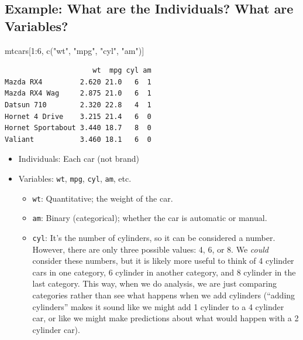 \documentclass[
  letterpaper,
  DIV=11,
  numbers=noendperiod,
  oneside]{scrreprt}
\newenvironment{Shaded}{\begin{snugshade}}{\end{snugshade}}
\newcommand{\DecValTok}[1]{\textcolor[rgb]{0.68,0.00,0.00}{#1}}
\newcommand{\FunctionTok}[1]{\textcolor[rgb]{0.28,0.35,0.67}{#1}}
\newcommand{\NormalTok}[1]{\textcolor[rgb]{0.00,0.23,0.31}{#1}}
\newcommand{\SpecialCharTok}[1]{\textcolor[rgb]{0.37,0.37,0.37}{#1}}
\newcommand{\StringTok}[1]{\textcolor[rgb]{0.13,0.47,0.30}{#1}}
\providecommand{\tightlist}{%
  \setlength{\itemsep}{0pt}\setlength{\parskip}{0pt}}\usepackage{longtable,booktabs,array}
\begin{document}
\hypertarget{example-what-are-the-individuals-what-are-variables}{%
\subsection{Example: What are the Individuals? What are
Variables?}\label{example-what-are-the-individuals-what-are-variables}}

\begin{Shaded}
\begin{Highlighting}[]
\NormalTok{mtcars[}\DecValTok{1}\SpecialCharTok{:}\DecValTok{6}\NormalTok{, }\FunctionTok{c}\NormalTok{(}\StringTok{"wt"}\NormalTok{, }\StringTok{"mpg"}\NormalTok{, }\StringTok{"cyl"}\NormalTok{, }\StringTok{"am"}\NormalTok{)]}
\end{Highlighting}
\end{Shaded}

\begin{verbatim}
                     wt  mpg cyl am
Mazda RX4         2.620 21.0   6  1
Mazda RX4 Wag     2.875 21.0   6  1
Datsun 710        2.320 22.8   4  1
Hornet 4 Drive    3.215 21.4   6  0
Hornet Sportabout 3.440 18.7   8  0
Valiant           3.460 18.1   6  0
\end{verbatim}

\begin{itemize}
\tightlist
\item
  Individuals: Each car (not brand)
\item
  Variables: \texttt{wt}, \texttt{mpg}, \texttt{cyl}, \texttt{am}, etc.

  \begin{itemize}
  \tightlist
  \item
    \texttt{wt}: Quantitative; the weight of the car.
  \item
    \texttt{am}: Binary (categorical); whether the car is automatic or
    manual.
  \item
    \texttt{cyl}: It's the number of cylinders, so it can be considered
    a number. However, there are only three possible values: 4, 6, or 8.
    We \emph{could} consider these numbers, but it is likely more useful
    to think of 4 cylinder cars in one category, 6 cylinder in another
    category, and 8 cylinder in the last category. This way, when we do
    analysis, we are just comparing categories rather than see what
    happens when we add cylinders (``adding cylinders'' makes it sound
    like we might add 1 cylinder to a 4 cylinder car, or like we might
    make predictions about what would happen with a 2 cylinder car).
  \end{itemize}
\end{itemize}
\end{document}
